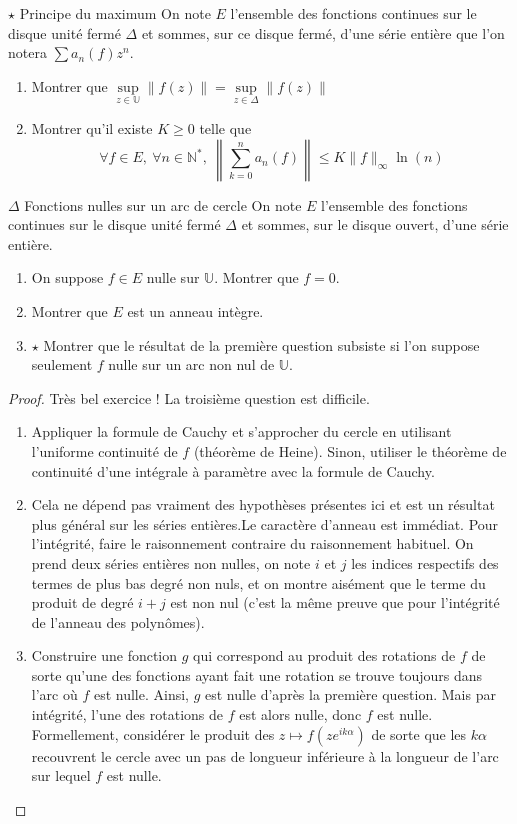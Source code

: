 \documentclass[french,a4paper]{article}
\newcommand{\N}{\mathbb{N}}
\newcommand{\U}{\mathbb{U}}
\newcommand{\st}{^*}
\theoremstyle{plain}
\theoremstyle{definition}
\theoremstyle{remark}
\begin{document}
\begin{ex}[Moulin.SE.32]{$\star$ Principe du maximum}
	On note $E$ l'ensemble des fonctions continues sur le disque unité fermé $\Delta$ et sommes, sur ce disque fermé, d'une série entière que l'on notera $\sum a_n(f)z^n$.
	\begin{enumerate}
		\item Montrer que $\displaystyle\underset{z\in\U}{\sup}\lVert f(z)\rVert=\underset{z\in\Delta}{\sup}\lVert f(z)\rVert$
		\item Montrer qu'il existe $K\geqslant0$ telle que $$\forall f\in E,\ \forall n\in\N\st,\ \left\lVert\sum_{k=0}^{n}a_n(f)\right\rVert\leqslant K\lVert f\rVert_\infty\ln(n)$$
	\end{enumerate}
\end{ex}

\begin{ex}[Moulin.SE.33]{$\Delta$ Fonctions nulles sur un arc de cercle}
	On note $E$ l'ensemble des fonctions continues sur le disque unité fermé $\Delta$ et sommes, sur le disque ouvert, d'une série entière.
	\begin{enumerate}
		\item On suppose $f\in E$ nulle sur $\U$. Montrer que $f=0$.
		\item Montrer que $E$ est un anneau intègre.
		\item $\star$ Montrer que le résultat de la première question subsiste si l'on suppose seulement $f$ nulle sur un arc non nul de $\U$.
	\end{enumerate}
\end{ex}
\begin{proof}
	Très bel exercice ! La troisième question est difficile.
	\begin{enumerate}
		\item Appliquer la formule de Cauchy et s'approcher du cercle en utilisant l'uniforme continuité de $f$ (théorème de Heine). Sinon, utiliser le théorème de continuité d'une intégrale à paramètre avec la formule de Cauchy.
		\item Cela ne dépend pas vraiment des hypothèses présentes ici et est un résultat plus général sur les séries entières.Le caractère d'anneau est immédiat. Pour l'intégrité, faire le raisonnement contraire du raisonnement habituel. On prend deux séries entières non nulles, on note $i$ et $j$ les indices respectifs des termes de plus bas degré non nuls, et on montre aisément que le terme du produit de degré $i+j$ est non nul (c'est la même preuve que pour l'intégrité de l'anneau des polynômes).
		\item Construire une fonction $g$ qui correspond au produit des rotations de $f$ de sorte qu'une des fonctions ayant fait une rotation se trouve toujours dans l'arc où $f$ est nulle. Ainsi, $g$ est nulle d'après la première question. Mais par intégrité, l'une des rotations de $f$ est alors nulle, donc $f$ est nulle. Formellement, considérer le produit des $z\mapsto f(ze^{ik\alpha})$ de sorte que les $k\alpha$ recouvrent le cercle avec un pas de longueur inférieure à la longueur de l'arc sur lequel $f$ est nulle.
	\end{enumerate}
\end{proof}
\end{document}
